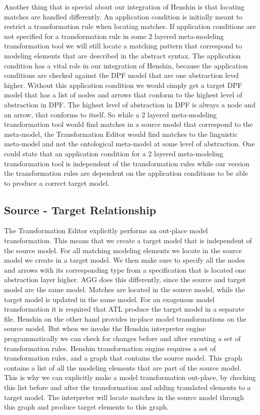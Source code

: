 Another thing that is special about our integration of Henshin is that locating
matches are handled differently. An application condition is initially meant to
restrict a transformation rule when locating matches. If application conditions
are not specified for a transformation rule in some 2 layered meta-modeling
transformation tool we will still locate a matching pattern that correspond to
modeling elements that are described in the abstract syntax. The application
condition has a vital role in our integration of Henshin, because the
application conditions are checked against the DPF model that are one
abstraction level higher. Without this application condition we would simply get
a target DPF model that has a list of nodes and arrows that conform to the
highest level of abstraction in DPF. The highest level of abstraction in DPF
is always a node and an arrow, that conforms to itself. So while a 2 layered
meta-modeling transformation tool would find matches in a source model that
correspond to the meta-model, the Transformation Editor would find matches to
the linguistic meta-model and not the ontological meta-model at some level of
abstraction. One could state that an application condition for a 2 layered
meta-modeling transformation tool is independent of the transformation rules
while our version the transformation rules are dependent on the application
conditions to be able to produce a correct target model. 

\subsection{Source - Target Relationship}

The Transformation Editor explicitly performs an out-place model
transformation. This means that we create a target model that is independent of
the source model. For all matching modeling elements we locate in the source
model we create in a target model. We then make sure to specify all the nodes
and arrows with its corresponding type from a specification that is located one
abstraction layer higher. AGG does this differently, since the source and target
model are the same model. Matches are located in the source model, while the
target model is updated in the same model. For an exogenous model transformation
it is required that ATL produce the target model in a separate file. Henshin on
the other hand provides in-place model transformations on the source model. But
when we invoke the Henshin interpreter engine programmatically we can check for
changes before and after exeuting a set of transformation rules. Henshin
transformation engine requires a set of transformation rules, and a graph that
contains the source model. This graph contains a list of all the modeling
elements that are part of the source model. This is why we can explicitly make a
model transformation out-place, by checking this list before and after the
transformation and adding translated elements to a target model. The interpreter
will locate matches in the source model through this graph and produce target
elements to this graph. 

